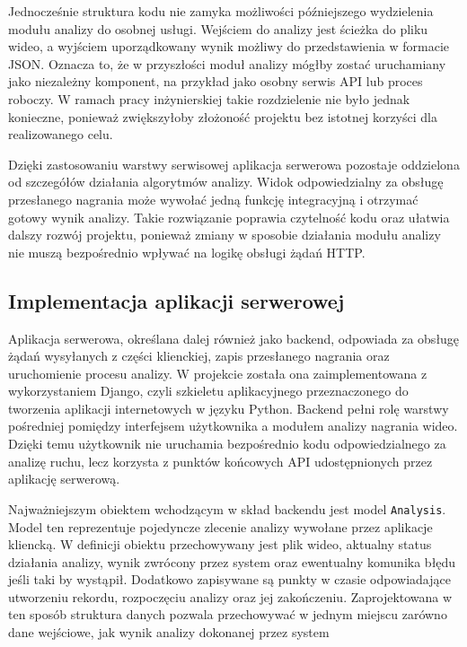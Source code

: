 Jednocześnie struktura kodu nie zamyka możliwości późniejszego wydzielenia modułu analizy do osobnej usługi. Wejściem do analizy jest ścieżka do pliku wideo, a wyjściem uporządkowany wynik możliwy do przedstawienia w formacie JSON. Oznacza to, że w przyszłości moduł analizy mógłby zostać uruchamiany jako niezależny komponent, na przykład jako osobny serwis API lub proces roboczy. W ramach pracy inżynierskiej takie rozdzielenie nie było jednak konieczne, ponieważ zwiększyłoby złożoność projektu bez istotnej korzyści dla realizowanego celu.

Dzięki zastosowaniu warstwy serwisowej aplikacja serwerowa pozostaje oddzielona od szczegółów działania algorytmów analizy. Widok odpowiedzialny za obsługę przesłanego nagrania może wywołać jedną funkcję integracyjną i otrzymać gotowy wynik analizy. Takie rozwiązanie poprawia czytelność kodu oraz ułatwia dalszy rozwój projektu, ponieważ zmiany w sposobie działania modułu analizy nie muszą bezpośrednio wpływać na logikę obsługi żądań HTTP.

\subsection{Implementacja aplikacji serwerowej}

Aplikacja serwerowa, określana dalej również jako backend, odpowiada za obsługę żądań wysyłanych z części klienckiej, zapis przesłanego nagrania oraz uruchomienie procesu analizy. W projekcie została ona zaimplementowana z wykorzystaniem Django, czyli szkieletu aplikacyjnego przeznaczonego do tworzenia aplikacji internetowych w języku Python. Backend pełni rolę warstwy pośredniej pomiędzy interfejsem użytkownika a modułem analizy nagrania wideo. Dzięki temu użytkownik nie uruchamia bezpośrednio kodu odpowiedzialnego za analizę ruchu, lecz korzysta z punktów końcowych API udostępnionych przez aplikację serwerową.

Najważniejszym obiektem wchodzącym w skład backendu jest model \texttt{Analysis}. Model ten reprezentuje pojedyncze zlecenie analizy wywołane przez aplikacje kliencką. W definicji obiektu przechowywany jest plik wideo, aktualny status działania analizy,  wynik zwrócony przez system oraz ewentualny komunika błędu jeśli taki by wystąpił. Dodatkowo zapisywane są punkty w czasie odpowiadające utworzeniu rekordu, rozpoczęciu analizy oraz jej zakończeniu. Zaprojektowana w ten sposób struktura danych pozwala przechowywać w jednym miejscu zarówno dane wejściowe, jak wynik analizy dokonanej przez system

